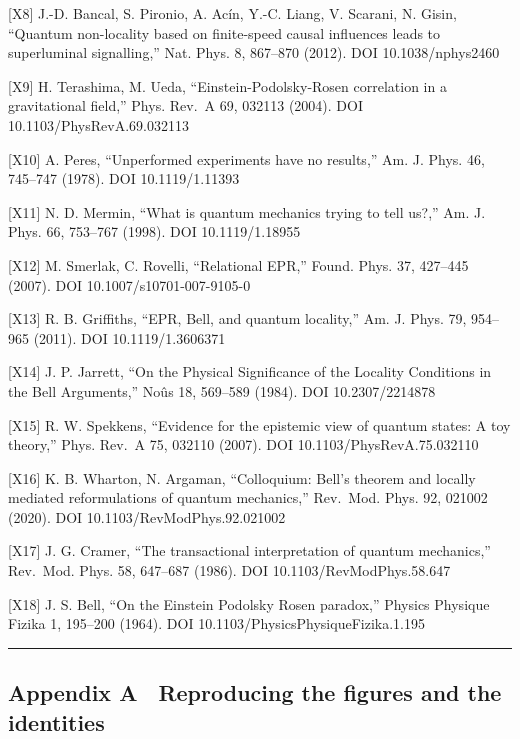 \documentclass[
  a4paper,
]{article}
\begin{document}
{[}X8{]} J.-D. Bancal, S. Pironio, A. Acín, Y.-C. Liang, V. Scarani, N.
Gisin, ``Quantum non-locality based on finite-speed causal influences
leads to superluminal signalling,'' Nat. Phys. 8, 867--870 (2012). DOI
10.1038/nphys2460

{[}X9{]} H. Terashima, M. Ueda, ``Einstein-Podolsky-Rosen correlation in
a gravitational field,'' Phys. Rev.~A 69, 032113 (2004). DOI
10.1103/PhysRevA.69.032113

{[}X10{]} A. Peres, ``Unperformed experiments have no results,'' Am. J.
Phys. 46, 745--747 (1978). DOI 10.1119/1.11393

{[}X11{]} N. D. Mermin, ``What is quantum mechanics trying to tell
us?,'' Am. J. Phys. 66, 753--767 (1998). DOI 10.1119/1.18955

{[}X12{]} M. Smerlak, C. Rovelli, ``Relational EPR,'' Found. Phys. 37,
427--445 (2007). DOI 10.1007/s10701-007-9105-0

{[}X13{]} R. B. Griffiths, ``EPR, Bell, and quantum locality,'' Am. J.
Phys. 79, 954--965 (2011). DOI 10.1119/1.3606371

{[}X14{]} J. P. Jarrett, ``On the Physical Significance of the Locality
Conditions in the Bell Arguments,'' Noûs 18, 569--589 (1984). DOI
10.2307/2214878

{[}X15{]} R. W. Spekkens, ``Evidence for the epistemic view of quantum
states: A toy theory,'' Phys. Rev.~A 75, 032110 (2007). DOI
10.1103/PhysRevA.75.032110

{[}X16{]} K. B. Wharton, N. Argaman, ``Colloquium: Bell's theorem and
locally mediated reformulations of quantum mechanics,'' Rev.~Mod. Phys.
92, 021002 (2020). DOI 10.1103/RevModPhys.92.021002

{[}X17{]} J. G. Cramer, ``The transactional interpretation of quantum
mechanics,'' Rev.~Mod. Phys. 58, 647--687 (1986). DOI
10.1103/RevModPhys.58.647

{[}X18{]} J. S. Bell, ``On the Einstein Podolsky Rosen paradox,''
Physics Physique Fizika 1, 195--200 (1964). DOI
10.1103/PhysicsPhysiqueFizika.1.195

\begin{center}\rule{0.5\linewidth}{0.5pt}\end{center}

\subsection{Appendix A　Reproducing the figures and the
identities}\label{appendix-a-reproducing-the-figures-and-the-identities}
\end{document}
